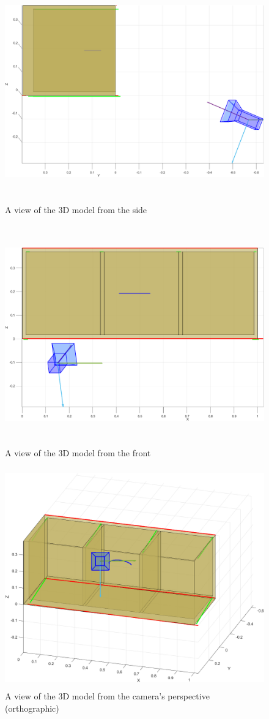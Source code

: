 \begin{figure}[H]
\centering
\includegraphics[height=9.5cm, width=\textwidth, keepaspectratio]{Report/Images/3dModel/3D_model_3.png}
\caption{\label{fig:3D model 3}A view of the 3D model from the side}
\end{figure}

\begin{figure}[H]
\centering
\includegraphics[height=9.5cm, width=\textwidth, keepaspectratio]{Report/Images/3dModel/3D_model_4.png}
\caption{\label{fig:3D model 4}A view of the 3D model from the front}
\end{figure}

\begin{figure}[H]
\centering
\includegraphics[height=9.5cm, width=\textwidth, keepaspectratio]{Report/Images/3dModel/3D_model_5.png}
\caption{\label{fig:3D model 5}A view of the 3D model from the camera's perspective (orthographic)}
\end{figure}